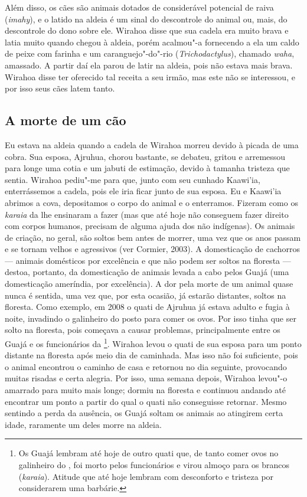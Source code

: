 Além disso, os cães são animais dotados de considerável potencial de
raiva (\emph{imahy}), e o latido na aldeia é um sinal do descontrole do
animal ou, mais, do descontrole do dono sobre ele. Wirahoa disse que sua
cadela era muito brava e latia muito quando chegou à aldeia, porém
acalmou"-a fornecendo a ela um caldo de peixe com farinha e um
caranguejo"-do"-rio (\emph{Trichodactylus}), chamado \emph{waha},
amassado. A partir daí ela parou de latir na aldeia, pois não estava
mais brava. Wirahoa disse ter oferecido tal receita a seu irmão, mas
este não se interessou, e por isso seus cães latem tanto.

\subsection{A morte de um cão}

\forceindent
Eu estava na aldeia quando a cadela de Wirahoa morreu devido à picada de
uma cobra. Sua esposa, Ajruhua, chorou bastante, se debateu, gritou e
arremessou para longe uma cotia e um jabuti de estimação, devido à
tamanha tristeza que sentia. Wirahoa pediu"-me para que, junto com seu
cunhado Kaawi'ia, enterrássemos a cadela, pois ele iria ficar junto de
sua esposa. Eu e Kaawi'ia abrimos a cova, depositamos o corpo do animal
e o enterramos. Fizeram como os \emph{karaia} da  lhe ensinaram a
fazer (mas que até hoje não conseguem fazer direito com corpos humanos,
precisam de alguma ajuda dos não indígenas). Os animais de criação, no
geral, são soltos bem antes de morrer, uma vez que os anos passam e se
tornam velhos e agressivos (ver Cormier, 2003). A domesticação de
cachorros --- animais domésticos por excelência e que não podem ser soltos
na floresta --- destoa, portanto, da domesticação de animais levada a cabo
pelos Guajá (uma domesticação ameríndia, por excelência). A dor pela
morte de um animal quase nunca é sentida, uma vez que, por esta ocasião,
já estarão distantes, soltos na floresta. Como exemplo, em 2008 o quati
de Ajruhua já estava adulto e fugia à noite, invadindo o galinheiro do
posto para comer os ovos. Por isso tinha que ser solto na floresta, pois
começava a causar problemas, principalmente entre os Guajá e os
funcionários da \footnote{Os Guajá lembram até hoje de outro quati
  que, de tanto comer ovos no galinheiro do , foi morto pelos
  funcionários e virou almoço para os brancos (\emph{karaia}). Atitude
  que até hoje lembram com desconforto e tristeza por considerarem uma
  barbárie.}. Wirahoa levou o quati de sua esposa para um ponto distante
na floresta após meio dia de caminhada. Mas isso não foi suficiente,
pois o animal encontrou o caminho de casa e retornou no dia seguinte,
provocando muitas risadas e certa alegria. Por isso, uma semana depois,
Wirahoa levou"-o amarrado para muito mais longe; dormiu na floresta e
continuou andando até encontrar um ponto a partir do qual o quati não
conseguisse retornar. Mesmo sentindo a perda da ausência, os Guajá
soltam os animais ao atingirem certa idade, raramente um deles morre na
aldeia.

